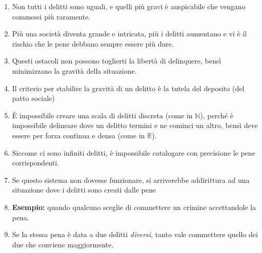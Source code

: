 \documentclass{article}
\begin{document}
\begin{enumerate}
    \item Non tutti i delitti sono uguali, e quelli più gravi è auspicabile che vengano commessi più raramente.
    \item Più una società diventa grande e intricata, più i delitti aumentano e vi è il rischio che le pene debbano sempre essere più dure.
    \item Questi ostacoli non possono toglierti la libertà di delinquere, bensì minimizzano
    la gravità della situazione.
    \item Il criterio per stabilire la gravità di un delitto è la tutela del deposito (del patto sociale)
    \item È impossibile creare una scala di delitti discreta (come in \(\mathbb{N}\)), perché è impossibile delineare dove
    un delitto termini e ne cominci un altro, bensì deve essere per forza continua e densa (come in \(\mathbb{R}\)).
    \item Siccome ci sono infiniti delitti, è impossibile catalogare con precisione le pene corrispondenti.
    \item Se questo sistema non dovesse funzionare, si arriverebbe addirittura ad una situazione dove i delitti
    sono creati dalle pene
    \item \textbf{Esempio:} quando qualcuno sceglie di commettere un crimine accettandole la pena.
    \item Se la stessa pena è data a due delitti \textit{diversi}, tanto vale commettere quello dei due che conviene maggiormente.
\end{enumerate}

\phantom{}
\end{document}
